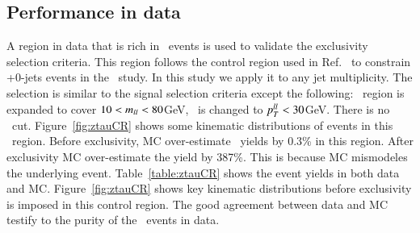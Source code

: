 \subsection{Performance in data}
\par A region in data that is rich in \Ztau\ events is used to validate the exclusivity selection 
criteria. This region follows the control region used in Ref.~\cite{ATLASCONF2014060} to constrain 
 \Ztau+0-jets events in the \HWW\ study. In this study we apply it to any jet multiplicity.
The selection is similar to the signal selection criteria except the following: \mll\ region is expanded to 
cover $10<m_{ll}<80 $GeV, \ptll\ is changed to $p_{T}^{ll}<30 $GeV. There is no \dfll\ cut. Figure~\ref{fig:ztauCR}
shows some kinematic distributions of events in this \Ztau\ region. Before exclusivity, MC over-estimate 
\Ztau\ yields by 0.3\% in this region. After exclusivity MC over-estimate the yield by 387\%.
This is because MC mismodeles the underlying event. Table~\ref{table:ztauCR} shows the event yields in both
data and MC. Figure~\ref{fig:ztauCR} shows key kinematic distributions before exclusivity is imposed 
in this control region. The good agreement between data and MC testify to the purity of the \Ztau\ events
in data.  

\begin{table}
\centering
\label{table:ztauCR}
\caption{\Ztau\ yields in the \Ztau\ control region. Right before exclusivity is imposed, MC over-estimate 
\Ztau\ yields by 0.3\%. After exclusivity, the over-estimation rises to 387\%.}
\end{table}


